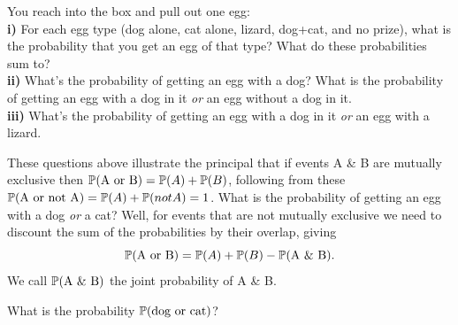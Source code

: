 \begin{question}
You reach into the box and pull out one egg:\\
{\bf i)} For each egg type (dog alone, cat alone, lizard, dog+cat, and no prize),
what is the probability that you get an egg of that type? What do these probabilities sum to?\\
{\bf ii)} What's the probability of getting an egg with a dog? What is
the probability of getting an egg with a dog in it {\it or} an egg without a dog in it. \\
{\bf iii)} What's the probability of getting an egg with a dog in it {\it or} an egg with a lizard. \\
\end{question}
These questions above illustrate the principal that if events A \& B
are mutually exclusive then $\P(\textrm{A or B}) = \P(A) + \P(B)$,
following from these $\P(\textrm{A or not A}) = \P(A) + \P(not A) =
1$. What is the probability of getting an egg with a dog {\it or} a
cat?  Well, for events that are not mutually exclusive we need to
discount the sum of the probabilities by their overlap, giving
\begin{equation}
\P(\textrm{A or B}) = \P(A) +\P(B) - \P(\textrm{A \& B}).
\end{equation}
We call $ \P(\textrm{A \& B}) $ the joint probability of A \& B.
\begin{question}
What is the probability $\P(\textrm{dog or cat})$?
\end{question}


